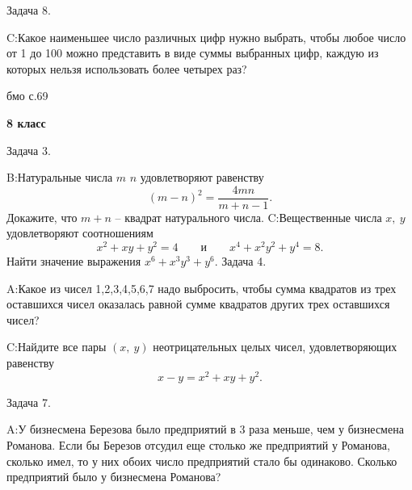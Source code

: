 \documentclass[11pt,a4paper,book]{ncc} \usepackage{modules/nonstahp_book}
\begin{document}
Задача 8.

\medbreak\noindent
C:\qquad Какое наименьшее число различных цифр нужно выбрать,
чтобы любое число от 1 до 100 можно представить в виде суммы выбранных цифр, каждую из которых нельзя использовать более четырех раз?

бмо с.69
\vfill\eject

\medbreak\centerline{\bfseries 8 класс}\bigbreak\noindent

\bigbreak\noindent

\bigbreak\noindent
Задача 3.\par\noindent

\medbreak\noindent
B:\qquad Натуральные числа $m$  $n$ удовлетворяют равенству
$$
(m-n)^2=\frac{4mn}{m+n-1}.
$$
Докажите, что $m+n$ -- квадрат натурального числа.
\medbreak\noindent
C:\qquad Вещественные числа $x,\  y$ удовлетворяют соотношениям
$$
x^2+xy+y^2=4\qquad\text{и}\qquad x^4+x^2y^2+y^4=8.
$$
Найти значение выражения $x^6+x^3y^3+y^6.$
\bigbreak\noindent
Задача 4. \par\noindent
A:\qquad Какое из чисел 1,2,3,4,5,6,7 надо выбросить, чтобы сумма квадратов из трех оставшихся чисел оказалась равной сумме квадратов других трех оставшихся чисел?
\medbreak\noindent

\medbreak\noindent
C:\qquad Найдите все пары $(x,\  y)$ неотрицательных целых чисел, удовлетворяющих равенству
$$x-y=x^2+xy+y^2.$$
\bigbreak\noindent

Задача 7. \par\noindent
A:\qquad У бизнесмена Березова было предприятий в 3 раза меньше, чем у бизнесмена Романова. Если бы Березов отсудил еще столько же предприятий у Романова, сколько имел, то у них обоих число предприятий стало бы одинаково. Сколько предприятий было у бизнесмена Романова?
\medbreak\noindent
\end{document}
